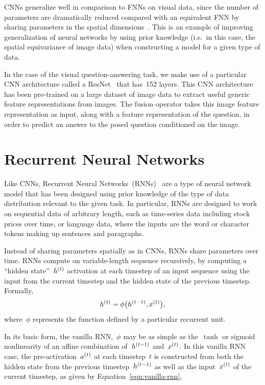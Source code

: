 CNNs generalize well in comparison to FNNs on visual data, since the number of
parameters are dramatically reduced compared with an equivalent FNN by sharing
parameters in the spatial dimensions~\citep{lecun-89}. This is an example of
improving generalization of neural networks by using prior knowledge (i.e.\ in
this case, the spatial equivariance of image data) when constructing a model
for a given type of data.

In the case of the visual question-answering task, we make use of a particular
CNN architecture called a ResNet~\citep{he2016deep} that has~\num{152} layers.
This CNN architecture has been pre-trained on a large dataset of image data to
extract useful generic feature representations from images.
The fusion operator takes this image feature representation as input, along
with a feature representation of the question, in order to predict an answer to
the posed question conditioned on the image.


\section{Recurrent Neural Networks}

Like CNNs, Recurrent Neural Networks~(RNNs)~\citep{rumelhart1986learning} are a
type of neural network model that has been designed using prior knowledge of
the type of data distribution relevant to the given task.
In particular, RNNs are designed to work on sequential data of arbitrary
length, such as time-series data including stock prices over time, or language
data, where the inputs are the word or character tokens making up sentences and
paragraphs.

Instead of sharing parameters spatially as in CNNs, RNNs share parameters over
time.
RNNs compute on variable-length sequence recursively, by computing a ``hidden
state''~$h^{(t)}$ activation at each timestep of an input sequence using
the input from the current timestep and the hidden state of the previous
timestep.
Formally,
\begin{equation}
h^{(t)} = \phi\big(h^{(t - 1)}, x^{(t)}\big),
\label{eqn:highlevel-rnn}
\end{equation}
where~$\phi$ represents the function defined by a particular recurrent unit.

In its basic form, the vanilla RNN,~$\phi$ may be as simple as the~$\tanh$ or
sigmoid nonlinearity of an affine combination of~$h^{(t - 1)}$
and~$x^{(t)}$.
In this vanilla RNN case, the pre-activation~$a^{(t)}$ at each timestep~$t$
is constructed from both the hidden state from the previous
timestep~$h^{(t - 1)}$ as well as the input~$x^{(t)}$ of the current
timestep, as given by Equation~\ref{eqn:vanilla-rnn},

